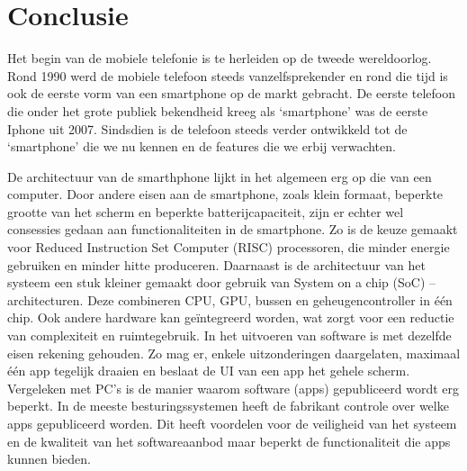 \chapter{Conclusie}

Het begin van de mobiele telefonie is te herleiden op de tweede wereldoorlog. Rond 1990 werd de mobiele telefoon steeds vanzelfsprekender en rond die tijd is ook de eerste vorm van een smartphone op de markt gebracht. De eerste telefoon die onder het grote publiek bekendheid kreeg als ‘smartphone’ was de eerste Iphone uit 2007. Sindsdien is de telefoon steeds verder ontwikkeld tot de ‘smartphone’ die we nu kennen en de features die we erbij verwachten.

De architectuur van de smarthphone lijkt in het algemeen erg op die van een computer. Door andere eisen aan de smartphone, zoals klein formaat, beperkte grootte van het scherm en beperkte batterijcapaciteit, zijn er echter wel consessies gedaan aan functionaliteiten in de smartphone. Zo is de keuze gemaakt voor Reduced Instruction Set Computer (RISC) processoren, die minder energie gebruiken en minder hitte produceren. Daarnaast is de architectuur van het systeem een stuk kleiner gemaakt door gebruik van System on a chip (SoC) –architecturen. Deze combineren CPU, GPU, bussen en geheugencontroller in één chip. Ook andere hardware kan geïntegreerd worden, wat zorgt voor een reductie van complexiteit en ruimtegebruik. In het uitvoeren van software is met dezelfde eisen rekening gehouden. Zo mag er, enkele uitzonderingen daargelaten, maximaal \'e\'en app tegelijk draaien en beslaat de UI van een app het gehele scherm. Vergeleken met PC's is de manier waarom software (apps) gepubliceerd wordt erg beperkt. In de meeste besturingssystemen heeft de fabrikant controle over welke apps gepubliceerd worden. Dit heeft voordelen voor de veiligheid van het systeem en de kwaliteit van het softwareaanbod maar beperkt de functionaliteit die apps kunnen bieden.

